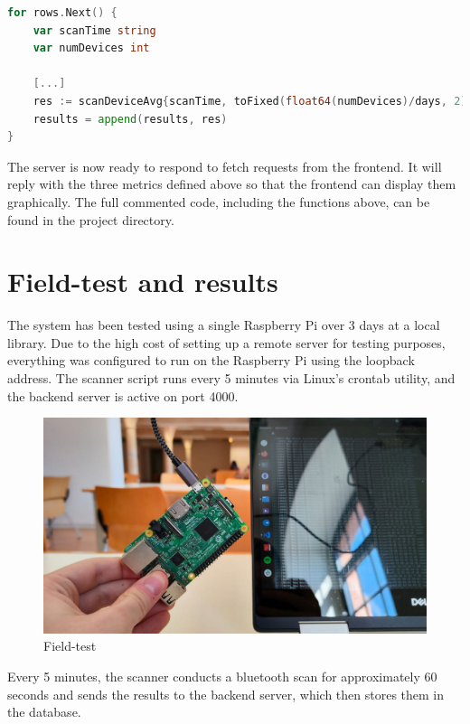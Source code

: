 \documentclass[a4paper, 11pt]{article}
\begin{document}
\begin{lstlisting}[language=Go]
for rows.Next() {
	var scanTime string
	var numDevices int

	[...]
	res := scanDeviceAvg{scanTime, toFixed(float64(numDevices)/days, 2)}
	results = append(results, res)
}
\end{lstlisting}

The server is now ready to respond to fetch requests from the frontend. It will reply with the three metrics defined above so that the frontend can display them graphically. The full commented code, including the functions above, can be found in the project directory.

\section{Field-test and results}
The system has been tested using a single Raspberry Pi over 3 days at a local library. Due to the high cost of setting up a remote server for testing purposes, everything was configured to run on the Raspberry Pi using the loopback address. The scanner script runs every 5 minutes via Linux's crontab utility, and the backend server is active on port 4000.

\begin{figure}
    \centering
    \includegraphics[width=1\linewidth]{images/RpiBiblioPhoto.jpg}
    \caption{Field-test}
    \label{fig:field-test}
\end{figure}

Every 5 minutes, the scanner conducts a bluetooth scan for approximately 60 seconds and sends the results to the backend server, which then stores them in the database.
\end{document}
